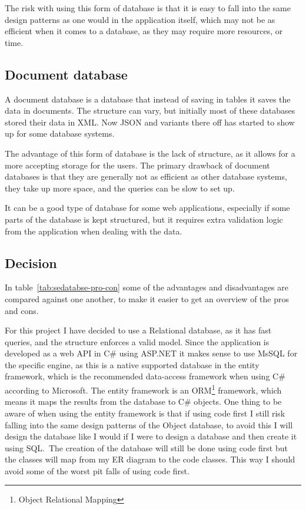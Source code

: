 The risk with using this form of database is that it is easy to fall into the
same design patterns as one would in the application itself, which may not be as
efficient when it comes to a database, as they may require more resources, or
time\cite{ibm:choosing_dbms}. 

\subsection{Document database}
\label{sub:Document database}
A document database is a database that instead of saving in tables it saves the
data in documents. The structure can vary, but initially most of these databases
stored their data in XML\cite{ibm:choosing_dbms}. Now JSON and variants there
off has started to show up for some database systems. 

The advantage of this form of database is the lack of structure, as it allows
for a more accepting storage for the users. The primary drawback of document
databases is that they are generally not as efficient as other database systems,
they take up more space, and the queries can be slow to set
up\cite{ibm:choosing_dbms}. 

It can be a good type of database for some web applications, especially if some
parts of the database is kept structured, but it requires extra validation logic
from the application when dealing with the data. 


\subsection{Decision }
\label{sub:database_decision}
In table~\ref{tab:sedatabse-pro-con} some of the advantages and disadvantages
are compared against one another, to make it easier to get an overview of the
pros and cons. 

For this project I have decided to use a Relational database, as it has fast
queries, and the structure enforces a valid model. Since the application is
developed as a web API in C\# using ASP.NET it makes sense to use MsSQL for the
specific engine, as this is a native supported database in the entity
framework, which is the recommended data-access framework when using C\#
according to Microsoft\cite{entity:microsoft}. The entity framework is an
ORM\footnote{Object Relational Mapping} framework, which means it maps the
results from the database to C\# objects. One thing to be aware of when
using the entity framework is that if using code first I still risk falling into
the same design patterns of the Object database, to avoid this I will design the
database like I would if I were to design a database and then create it
using SQL.\ The creation of the database will still be done using code first but
the classes will map from my ER diagram to the code classes. This way I should
avoid some of the worst pit falls of using code first.

